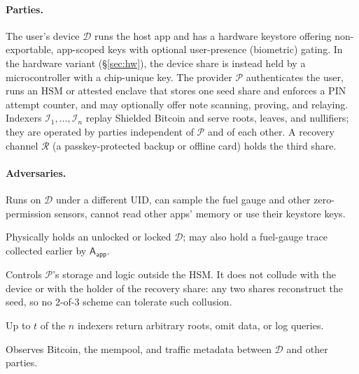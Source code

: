 \documentclass[11pt]{article}
\theoremstyle{remark}
\newcommand{\SB}{Shielded Bitcoin}
\begin{document}
\paragraph{Parties.} The user's device $\mathcal{D}$ runs the host app and has a hardware keystore offering non-exportable, app-scoped keys with optional user-presence (biometric) gating. In the hardware variant (§\ref{sec:hw}), the device share is instead held by a microcontroller with a chip-unique key. The provider $\mathcal{P}$ authenticates the user, runs an HSM or attested enclave that stores one seed share and enforces a PIN attempt counter, and may optionally offer note scanning, proving, and relaying. Indexers $\mathcal{I}_1,\dots,\mathcal{I}_n$ replay \SB{} and serve roots, leaves, and nullifiers; they are operated by parties independent of $\mathcal{P}$ and of each other. A recovery channel $\mathcal{R}$ (a passkey-protected backup or offline card) holds the third share.

\paragraph{Adversaries.}
\begin{description}[leftmargin=1em,style=nextline]
  \item[$\mathsf{A}_{\mathsf{app}}$ --- co-resident malicious app.] Runs on $\mathcal{D}$ under a different UID, can sample the fuel gauge and other zero-permission sensors, cannot read other apps' memory or use their keystore keys.
  \item[$\mathsf{A}_{\mathsf{thief}}$ --- device thief.] Physically holds an unlocked or locked $\mathcal{D}$; may also hold a fuel-gauge trace collected earlier by $\mathsf{A}_{\mathsf{app}}$.
  \item[$\mathsf{A}_{\mathsf{prov}}$ --- malicious or breached provider.] Controls $\mathcal{P}$'s storage and logic outside the HSM. It does not collude with the device or with the holder of the recovery share: any two shares reconstruct the seed, so no 2-of-3 scheme can tolerate such collusion.
  \item[$\mathsf{A}_{\mathsf{idx}}$ --- dishonest indexers.] Up to $t$ of the $n$ indexers return arbitrary roots, omit data, or log queries.
  \item[$\mathsf{A}_{\mathsf{net}}$ --- network observer.] Observes Bitcoin, the mempool, and traffic metadata between $\mathcal{D}$ and other parties.
\end{description}
\end{document}
